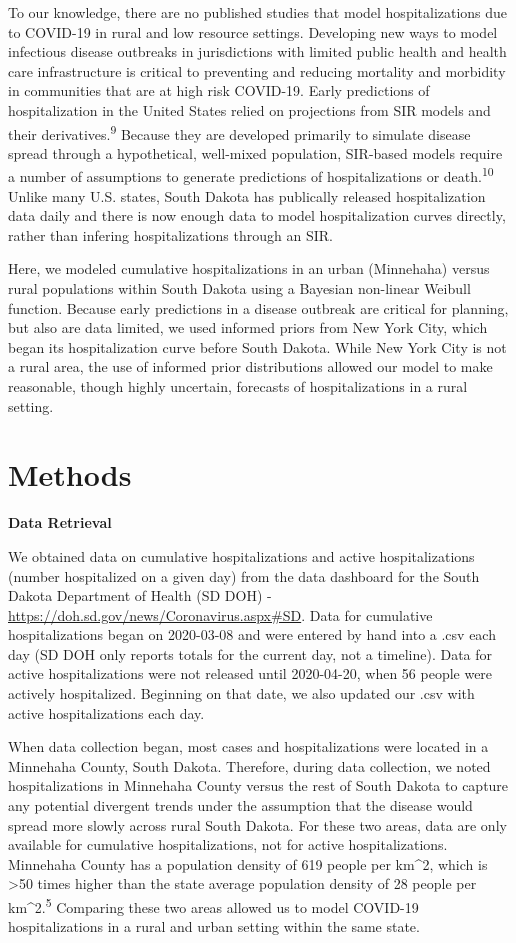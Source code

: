 \documentclass[
]{article}
\begin{document}
To our knowledge, there are no published studies that model hospitalizations due to COVID-19 in rural and low resource settings. Developing new ways to model infectious disease outbreaks in jurisdictions with limited public health and health care infrastructure is critical to preventing and reducing mortality and morbidity in communities that are at high risk COVID-19. Early predictions of hospitalization in the United States relied on projections from SIR models and their derivatives.\textsuperscript{9} Because they are developed primarily to simulate disease spread through a hypothetical, well-mixed population, SIR-based models require a number of assumptions to generate predictions of hospitalizations or death.\textsuperscript{10} Unlike many U.S. states, South Dakota has publically released hospitalization data daily and there is now enough data to model hospitalization curves directly, rather than infering hospitalizations through an SIR.

Here, we modeled cumulative hospitalizations in an urban (Minnehaha) versus rural populations within South Dakota using a Bayesian non-linear Weibull function. Because early predictions in a disease outbreak are critical for planning, but also are data limited, we used informed priors from New York City, which began its hospitalization curve before South Dakota. While New York City is not a rural area, the use of informed prior distributions allowed our model to make reasonable, though highly uncertain, forecasts of hospitalizations in a rural setting.

\hypertarget{methods}{%
\section{Methods}\label{methods}}

\textbf{Data Retrieval}

We obtained data on cumulative hospitalizations and active hospitalizations (number hospitalized on a given day) from the data dashboard for the South Dakota Department of Health (SD DOH) - \url{https://doh.sd.gov/news/Coronavirus.aspx\#SD}. Data for cumulative hospitalizations began on 2020-03-08 and were entered by hand into a .csv each day (SD DOH only reports totals for the current day, not a timeline). Data for active hospitalizations were not released until 2020-04-20, when 56 people were actively hospitalized. Beginning on that date, we also updated our .csv with active hospitalizations each day.

When data collection began, most cases and hospitalizations were located in a Minnehaha County, South Dakota. Therefore, during data collection, we noted hospitalizations in Minnehaha County versus the rest of South Dakota to capture any potential divergent trends under the assumption that the disease would spread more slowly across rural South Dakota. For these two areas, data are only available for cumulative hospitalizations, not for active hospitalizations. Minnehaha County has a population density of 619 people per km\^{}2, which is \textgreater50 times higher than the state average population density of 28 people per km\^{}2.\textsuperscript{5} Comparing these two areas allowed us to model COVID-19 hospitalizations in a rural and urban setting within the same state.
\end{document}
